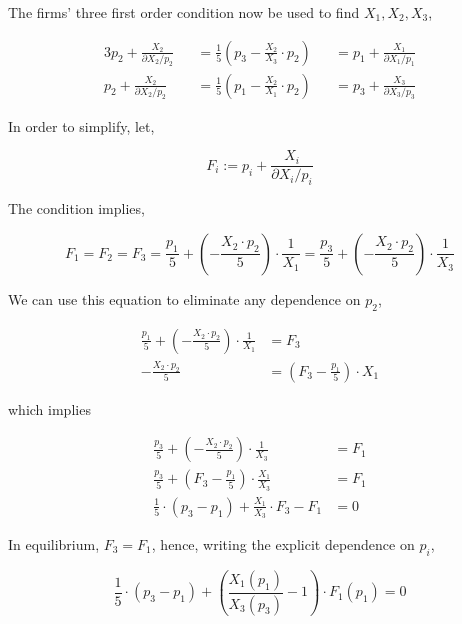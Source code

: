 \documentclass[american]{scrartcl}
\begin{document}
The firms' three first order condition now be used to find $X_1, X_2, X_3$,

\begin{alignat*}{3}
	p_2 + \frac{X_2}{\partial X_2 / p_2} &  & = \frac{1}{5} \left( p_3 - \frac{X_2}{X_3} \cdot p_2  \right) &  & = p_1 + \frac{X_1}{\partial X_1 / p_1} \\
	p_2 + \frac{X_2}{\partial X_2 / p_2} &  & = \frac{1}{5} \left( p_1 - \frac{X_2}{X_1} \cdot p_2  \right) &  & = p_3 + \frac{X_3}{\partial X_3 / p_3}
\end{alignat*}

In order to simplify, let,

\begin{equation}
	F_i := p_i +  \frac{X_i}{\partial X_i / p_i}
\end{equation}

The condition implies,

\begin{equation}
	F_1 = F_2 = F_3 = \frac{p_1}{5} + \left(- \frac{X_2 \cdot p_2}{5} \right) \cdot \frac{1}{X_1} = \frac{p_3}{5} + \left(- \frac{X_2 \cdot p_2}{5} \right) \cdot \frac{1}{X_3}
\end{equation}

We can use this equation to eliminate any dependence on $p_2$,

\begin{equation}
	\begin{split}
		\frac{p_1}{5} + \left(- \frac{X_2 \cdot p_2}{5} \right) \cdot \frac{1}{X_1} &= F_3 \\
		- \frac{X_2 \cdot p_2}{5} &= \left( F_3 - \frac{p_1}{5} \right) \cdot X_1
	\end{split}
\end{equation}

which implies

\begin{equation}
	\begin{split}
		\frac{p_3}{5} + \left(- \frac{X_2 \cdot p_2}{5} \right) \cdot \frac{1}{X_3} &= F_1 \\
		\frac{p_3}{5} + \left( F_3 - \frac{p_1}{5} \right) \cdot \frac{X_1}{X_3} &= F_1 \\
		\frac{1}{5} \cdot (p_3 - p_1) + \frac{X_1}{X_3} \cdot F_3 - F_1 &= 0
	\end{split}
\end{equation}

In equilibrium, $F_3 = F_1$, hence, writing the explicit dependence on $p_i$,

\begin{equation}
	\frac{1}{5} \cdot (p_3 - p_1) + \left( \frac{X_1(p_1)}{X_3(p_3)} - 1 \right) \cdot F_1(p_1)= 0
\end{equation}
\end{document}
